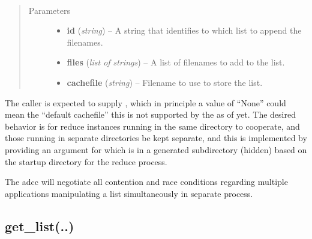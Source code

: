 \documentclass[letterpaper,10pt,english]{sphinxmanual}
\begin{document}
\begin{fulllineitems}
\label{chapter_ReductionContextClass:astrodata.RecipeManager.ReductionContext.list_append}~\begin{quote}\begin{description}
\item[{Parameters}] \leavevmode\begin{itemize}
\item {} 
\textbf{id} (\emph{string}) -- A string that identifies to which list to append the filenames.

\item {} 
\textbf{files} (\emph{list of strings}) -- A list of filenames to add to the list.

\item {} 
\textbf{cachefile} (\emph{string}) -- Filename to use to store the list.

\end{itemize}

\end{description}\end{quote}

The caller is expected to supply , which in principle
a value of ``None'' could mean the ``default cachefile'' this is not
supported by the  as of yet. The desired behavior is for
reduce instances running in the same directory to cooperate, and those
running in separate directories be kept separate, and this is 
implemented by providing an argument for  which is in a 
generated subdirectory (hidden) based on the startup directory
for the reduce process.

The adcc will negotiate all contention and race conditions regarding
multiple applications manipulating a list simultaneously in separate
process.

\end{fulllineitems}



\subsection{get\_list(..)}
\label{chapter_ReductionContextClass:get-list}
\end{document}
